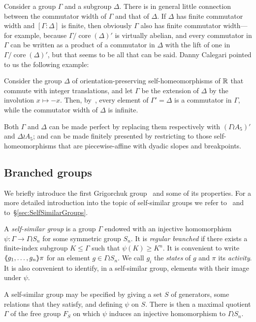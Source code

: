 \documentclass[a4paper,11pt]{amsart}
\begin{document}
Consider a group $\Gamma$ and a subgroup $\Delta$. There is in general
little connection between the commutator width of $\Gamma$ and that of
$\Delta$. If $\Delta$ has finite commutator width and
$[\Gamma:\Delta]$ is finite, then obviously $\Gamma$ also has finite
commutator width---for example, because
$\Gamma/\operatorname{core}(\Delta)'$ is virtually abelian, and every
commutator in $\Gamma$ can be written as a product of a commutator in
$\Delta$ with the lift of one in
$\Gamma/\operatorname{core}(\Delta)'$, but that seems to be all that
can be said. Danny Calegari pointed to us the following example:
\begin{ex}\label{ex:commwidthsubgroup}
  Consider the group $\Delta$ of orientation-preserving
  self-homeomorphisms of $\mathbb{R}$ that commute with integer translations,
  and let $\Gamma$ be the extension of $\Delta$ by the involution
  $x\mapsto-x$. Then, by~\cite[Theorems~2.3
  and~2.4]{Eisenbud-Hirsch-Neumann:SeifertBundles}, every element of
  $\Gamma'=\Delta$ is a commutator in $\Gamma$, while the commutator
  width of $\Delta$ is infinite.

  Both $\Gamma$ and $\Delta$ can be made perfect by replacing them
  respectively with $(\Gamma\wr A_5)'$ and $\Delta\wr A_5$; and can be
  made finitely presented by restricting to those self-homeo\-mor\-phisms
  that are piecewise-affine with dyadic slopes and breakpoints.
\end{ex}

\subsection{Branched groups}\label{ss:bg}
We briefly introduce the first Grigorchuk
group~\cite{Grigorchuk:Burnside} and some of its properties. For a more
detailed introduction into the topic of self-similar groups we refer
to~\cite{Nekrashevych:SelfSimilarGroups} and
to~\S\ref{sec:SelfSimilarGroups}.

A \emph{self-similar group} is a group $\Gamma$ endowed with an
injective homomorphism $\psi\colon\Gamma\to\Gamma\wr S_n$ for some
symmetric group $S_n$. It is \emph{regular branched} if there exists a
finite-index subgroup $K\le\Gamma$ such that $\psi(K)\ge K^n$. It is
convenient to write $\langle\negthickspace\langle g_1,\dots,g_n\rangle\negthickspace\rangle\pi$ for an element
$g\in\Gamma\wr S_n$. We call $g_i$ the \emph{states} of $g$ and $\pi$
its \emph{activity}. It is also convenient to identify, in a
self-similar group, elements with their image under $\psi$.

A self-similar group may be specified by giving a set $S$ of
generators, some relations that they satisfy, and defining $\psi$ on
$S$. There is then a maximal quotient $\Gamma$ of the free group $F_S$
on which $\psi$ induces an injective homomorphism to $\Gamma\wr S_n$.
\end{document}
